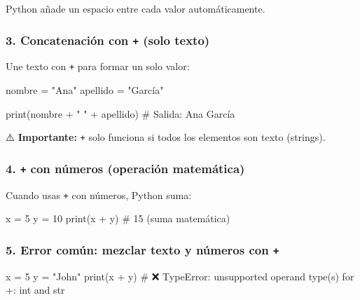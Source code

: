 \documentclass[
  doc,
  floatsintext,
  longtable,
  a4paper,
  nolmodern,
  notxfonts,
  notimes,
  12pt,
  colorlinks=true,linkcolor=blue,citecolor=blue,urlcolor=blue]{apa7}
\newenvironment{Shaded}{\begin{snugshade}}{\end{snugshade}}
\newcommand{\BuiltInTok}[1]{\textcolor[rgb]{0.00,0.23,0.31}{#1}}
\newcommand{\CommentTok}[1]{\textcolor[rgb]{0.37,0.37,0.37}{#1}}
\newcommand{\DecValTok}[1]{\textcolor[rgb]{0.68,0.00,0.00}{#1}}
\newcommand{\NormalTok}[1]{\textcolor[rgb]{0.00,0.23,0.31}{#1}}
\newcommand{\OperatorTok}[1]{\textcolor[rgb]{0.37,0.37,0.37}{#1}}
\newcommand{\StringTok}[1]{\textcolor[rgb]{0.13,0.47,0.30}{#1}}
\begin{document}
Python añade un espacio entre cada valor automáticamente.

\subsubsection{\texorpdfstring{3. Concatenación con \texttt{+} (solo
texto)}{3. Concatenación con + (solo texto)}}\label{concatenaciuxf3n-con-solo-texto}

Une texto con \texttt{+} para formar un solo valor:

\begin{Shaded}
\begin{Highlighting}[]
\NormalTok{nombre }\OperatorTok{=} \StringTok{"Ana"}
\NormalTok{apellido }\OperatorTok{=} \StringTok{"García"}

\BuiltInTok{print}\NormalTok{(nombre }\OperatorTok{+} \StringTok{" "} \OperatorTok{+}\NormalTok{ apellido)}
\CommentTok{\# Salida: Ana García}
\end{Highlighting}
\end{Shaded}

⚠️ \textbf{Importante:} \texttt{+} solo funciona si todos los elementos
son texto (strings).

\subsubsection{\texorpdfstring{4. \texttt{+} con números (operación
matemática)}{4. + con números (operación matemática)}}\label{con-nuxfameros-operaciuxf3n-matemuxe1tica}

Cuando usas \texttt{+} con números, Python suma:

\begin{Shaded}
\begin{Highlighting}[]
\NormalTok{x }\OperatorTok{=} \DecValTok{5}
\NormalTok{y }\OperatorTok{=} \DecValTok{10}
\BuiltInTok{print}\NormalTok{(x }\OperatorTok{+}\NormalTok{ y)  }\CommentTok{\# 15 (suma matemática)}
\end{Highlighting}
\end{Shaded}

\subsubsection{\texorpdfstring{5. Error común: mezclar texto y números
con
\texttt{+}}{5. Error común: mezclar texto y números con +}}\label{error-comuxfan-mezclar-texto-y-nuxfameros-con}

\begin{Shaded}
\begin{Highlighting}[]
\NormalTok{x }\OperatorTok{=} \DecValTok{5}
\NormalTok{y }\OperatorTok{=} \StringTok{"John"}
\BuiltInTok{print}\NormalTok{(x }\OperatorTok{+}\NormalTok{ y)  }\CommentTok{\# ❌ TypeError: unsupported operand type(s) for +: \textquotesingle{}int\textquotesingle{} and \textquotesingle{}str\textquotesingle{}}
\end{Highlighting}
\end{Shaded}
\end{document}
